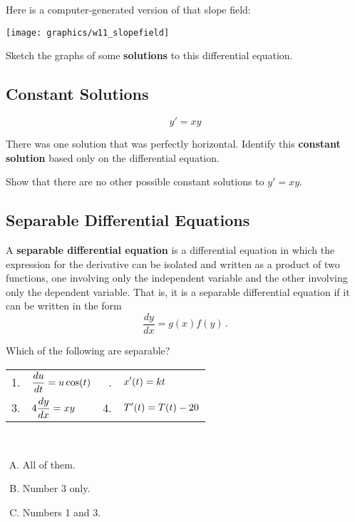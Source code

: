 \documentclass[12pt]{amsart}
\begin{document}
\newpage
Here is a computer-generated version of that slope field:
\begin{center}
\texttt{[image: graphics/w11\_slopefield]}
\end{center}
\begin{problem}
Sketch the graphs
of some {\bf solutions} to this differential equation.
\end{problem}

\newpage
{}
\subsection*{Constant Solutions}
$$ y' = xy$$
\begin{problem}
There was one solution that was perfectly horizontal.  Identify this {\bf constant solution}
based only on the differential equation. 
\end{problem}

\vfill

\begin{problem}
Show that there are no other possible constant solutions to $y' = xy$. 
\end{problem}

\vfill
\newpage
{}
\subsection*{Separable Differential Equations}
A {\bf separable differential equation} is a differential equation
in which the expression for the derivative can be isolated and
written as a product of two functions, one involving only the
independent variable and the other involving only the dependent
variable.  That is, it is a separable differential equation if it
can be written in the form
$$ \frac{dy}{dx} = g(x) f(y)\, .$$

\newpage
\begin{problem}
Which of the following are separable?
\begin{center}\begin{tabular}{rlrl}
1. & $\displaystyle \frac{du}{dt} = u\cos(t)$ &
\qquad \qquad 2. & $\displaystyle x^\prime (t) = k t$ \\[2.5ex]
3. & $\displaystyle 4\frac{dy}{dx} = xy$  &
4. & $\displaystyle T^\prime (t) = T(t)-20$ \\[1ex]
\end{tabular}\end{center}
~\\[1ex]
\begin{enumerate}[A.]
\item All of them. \\[1ex]
\item Number 3 only. \\[1ex]
\item Numbers 1 and 3.
\end{enumerate}

\end{problem}
\end{document}
